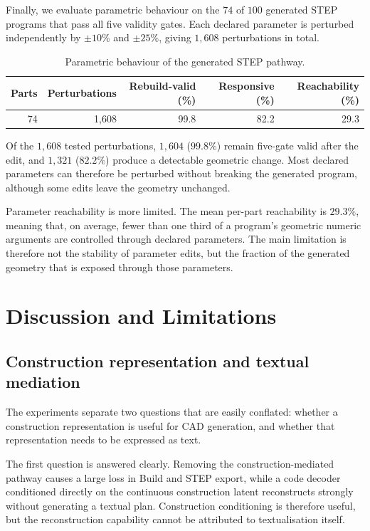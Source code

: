 \documentclass[preprint,12pt]{elsarticle}
\begin{document}
Finally, we evaluate parametric behaviour on the $74$ of $100$ generated STEP
programs that pass all five validity gates. Each declared parameter is perturbed
independently by $\pm10\%$ and $\pm25\%$, giving $1{,}608$ perturbations in
total.

\begin{table}[htbp]
  \centering
  \footnotesize
  \caption{Parametric behaviour of the generated STEP pathway.}
  \label{tab:parametricity}
  \begin{tabular}{rrrrr}
    \toprule
    Parts & Perturbations & Rebuild-valid (\%) & Responsive (\%) & Reachability (\%) \\
    \midrule
    74    & 1,608         & 99.8               & 82.2            & 29.3              \\
    \bottomrule
  \end{tabular}
\end{table}

Of the $1{,}608$ tested perturbations, $1{,}604$ ($99.8\%$) remain five-gate
valid after the edit, and $1{,}321$ ($82.2\%$) produce a detectable geometric
change. Most declared parameters can therefore be perturbed without breaking
the generated program, although some edits leave the geometry unchanged.

Parameter reachability is more limited. The mean per-part reachability is
$29.3\%$, meaning that, on average, fewer than one third of a program's
geometric numeric arguments are controlled through declared parameters.
The main limitation is therefore not the stability of parameter edits, but the
fraction of the generated geometry that is exposed through those parameters.


\section{Discussion and Limitations}
\label{sec:discussion}

\subsection{Construction representation and textual mediation}
\label{sec:disc_mediation}

The experiments separate two questions that are easily conflated: whether a
construction representation is useful for CAD generation, and whether that
representation needs to be expressed as text.

The first question is answered clearly. Removing the construction-mediated
pathway causes a large loss in Build and STEP export, while a code decoder
conditioned directly on the continuous construction latent reconstructs
strongly without generating a textual plan. Construction conditioning is
therefore useful, but the reconstruction capability cannot be attributed to
textualisation itself.
\end{document}
